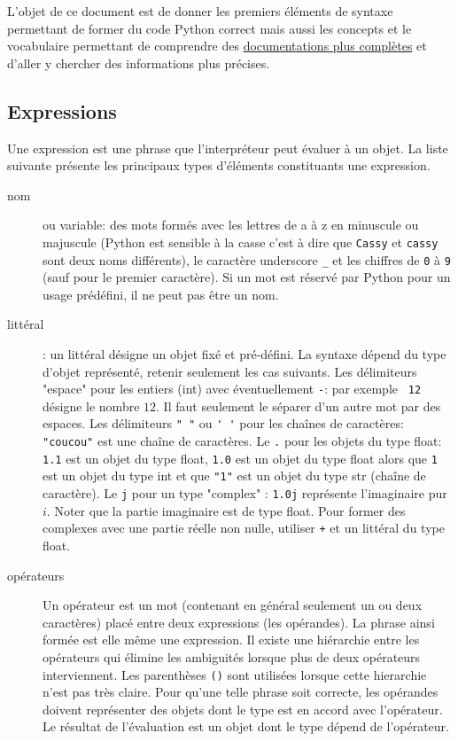 


L'objet de ce document est de donner les premiers éléments de syntaxe permettant de former du code Python correct mais aussi les concepts et le vocabulaire permettant de comprendre des \href{http://docs.python.org/3.3/reference/}{documentations plus complètes} et d'aller y chercher des informations plus précises.
\subsection{Expressions}
Une expression est une phrase que l'interpréteur peut évaluer à un objet. La liste suivante présente les principaux types d'éléments constituants une expression.
\begin{description}
 \item[nom] ou variable: des mots formés avec les lettres de a à z en minuscule ou majuscule (Python est sensible à la casse c'est à dire que \verb|Cassy| et \verb|cassy| sont deux noms différents), le caractère underscore \verb|_| et les chiffres de \verb|0| à \verb|9| (sauf pour le premier caractère). Si un mot est réservé par Python pour un usage prédéfini, il ne peut pas être un nom.
 \item[littéral] : un littéral désigne un objet fixé et pré-défini. La syntaxe dépend du type d'objet représenté, retenir seulement les cas suivants.\newline
Les délimiteurs "espace" pour les entiers (int) avec éventuellement \verb|-|: par exemple \verb| 12 | désigne le nombre $12$. Il faut seulement le séparer d'un autre mot par des espaces.\newline
Les délimiteurs \verb|" "| ou \verb|' '| pour les chaînes de caractères: \verb|"coucou"| est une chaîne de caractères.\newline
Le \verb|.| pour les objets du type float: \verb|1.1| est un objet du type float, \verb|1.0| est un objet du type float alors que \verb|1| est un objet du type int et que \verb|"1"| est un objet du type str (chaîne de caractère).\newline
Le \verb|j| pour un type "complex" : \verb|1.0j| représente l'imaginaire pur $i$. Noter que la partie imaginaire est de type float. Pour former des complexes avec une partie réelle non nulle, utiliser \verb|+| et un littéral du type float.

\item[opérateurs] Un opérateur est un mot (contenant en général seulement un ou deux caractères) placé entre deux expressions (les opérandes). La phrase ainsi formée est elle même une expression. Il existe une hiérarchie entre les opérateurs qui élimine les ambiguités lorsque plus de deux opérateurs interviennent. Les parenthèses \verb|()| sont utilisées lorsque cette hierarchie n'est pas très claire. Pour qu'une telle phrase soit correcte, les opérandes doivent représenter des objets dont le type est en accord avec l'opérateur. Le résultat de l'évaluation est un objet dont le type dépend de l'opérateur.  
\end{description}
